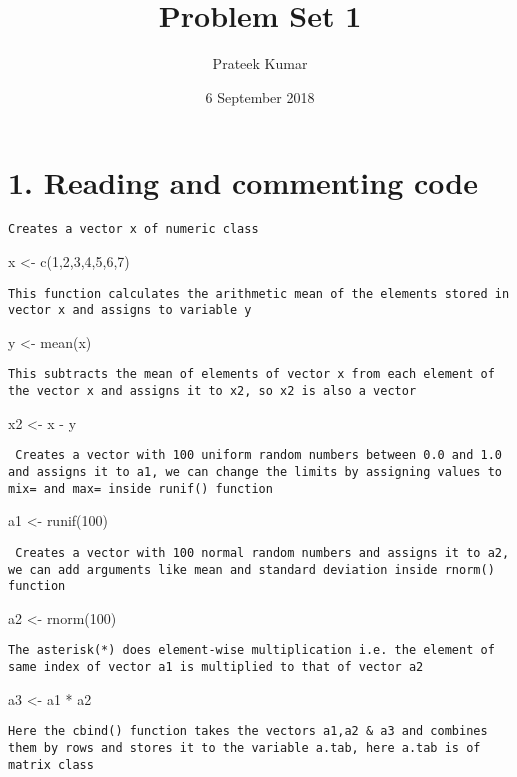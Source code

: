 \documentclass[]{article}
\title{Problem Set 1}
\author{Prateek Kumar}
\date{6 September 2018}
\begin{document}
\maketitle

\section{1. Reading and commenting
code}\label{reading-and-commenting-code}

\begin{verbatim}
Creates a vector x of numeric class
\end{verbatim}

x \textless{}- c(1,2,3,4,5,6,7)

\begin{verbatim}
This function calculates the arithmetic mean of the elements stored in vector x and assigns to variable y
\end{verbatim}

y \textless{}- mean(x)

\begin{verbatim}
This subtracts the mean of elements of vector x from each element of the vector x and assigns it to x2, so x2 is also a vector
\end{verbatim}

x2 \textless{}- x - y

\begin{verbatim}
 Creates a vector with 100 uniform random numbers between 0.0 and 1.0 and assigns it to a1, we can change the limits by assigning values to mix= and max= inside runif() function
\end{verbatim}

a1 \textless{}- runif(100)

\begin{verbatim}
 Creates a vector with 100 normal random numbers and assigns it to a2, we can add arguments like mean and standard deviation inside rnorm() function
\end{verbatim}

a2 \textless{}- rnorm(100)

\begin{verbatim}
The asterisk(*) does element-wise multiplication i.e. the element of same index of vector a1 is multiplied to that of vector a2
\end{verbatim}

a3 \textless{}- a1 * a2

\begin{verbatim}
Here the cbind() function takes the vectors a1,a2 & a3 and combines them by rows and stores it to the variable a.tab, here a.tab is of matrix class
\end{verbatim}
\end{document}
